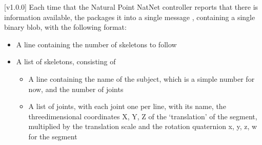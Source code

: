 [v1.0.0]
Each time that the Natural Point NatNet controller reports that there is information
available, the  packages it into a single message
\openSq{}\closeSq, containing a single binary blob, with the following
format:
\begin{itemize}
\item A line containing the number of skeletons to follow
\item\exSp{}A list of skeletons, consisting of
\begin{itemize}
\item A line containing the name of the subject, which is a simple number for now, and the
number of joints
\item\exSp{}A list of joints, with each joint one per line, with its name, the
three\longDash{}dimensional coordinates \openSq{}X, Y, Z\closeSq{} of the `translation'
of the segment, multiplied by the translation scale and the rotation quaternion
\openSq{}x, y, z, w\closeSq{} for the segment
\end{itemize}
\end{itemize}
\primaryEnd{}
